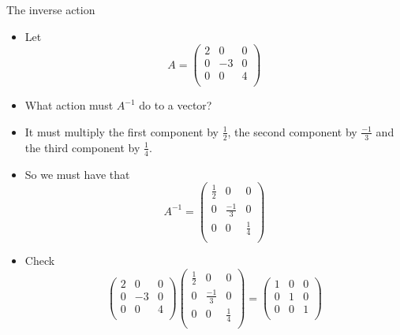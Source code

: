 \documentclass{beamer}
\begin{document}
\begin{frame}{The inverse action}

\begin{itemize}
\item Let
$$
A =
\begin{pmatrix}
2 & 0 & 0 \\
0 & -3 & 0 \\
0 & 0 & 4 \\
\end{pmatrix}
$$
\item What action must $A^{-1}$ do to a vector?
\item It must multiply the first component by $\frac{1}{2}$, the second component by
$\frac{-1}{3}$  and the third component by $\frac{1}{4}$.
\item So we must have that
$$
A^{-1} =
\begin{pmatrix}
\frac{1}{2} & 0 & 0 \\
0 & \frac{-1}{3} & 0 \\
0 & 0 & \frac{1}{4} \\
\end{pmatrix}
$$
\item Check
$$
\begin{pmatrix}
2 & 0 & 0 \\
0 & -3 & 0 \\
0 & 0 & 4 \\
\end{pmatrix}
\begin{pmatrix}
\frac{1}{2} & 0 & 0 \\
0 & \frac{-1}{3} & 0 \\
0 & 0 & \frac{1}{4} \\
\end{pmatrix}
=
\begin{pmatrix}
1 & 0 & 0 \\
0 & 1 & 0 \\
0 & 0 & 1 \\
\end{pmatrix}
$$
\end{itemize}
\end{frame}
\end{document}
